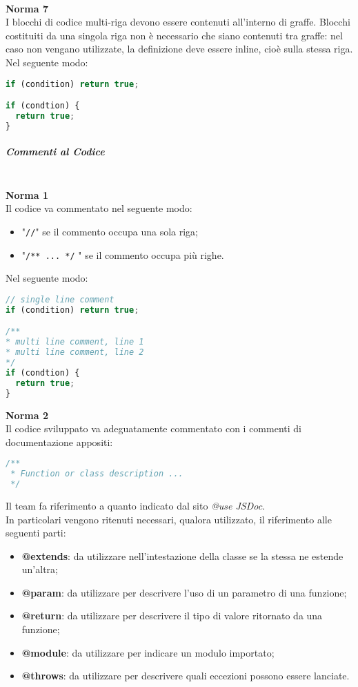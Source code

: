 \-\\
\textbf{Norma 7}\\
I blocchi di codice multi-riga devono essere contenuti all'interno di graffe. Blocchi costituiti da una singola riga non è necessario che siano contenuti tra graffe: nel caso non vengano utilizzate, la definizione deve essere inline, cioè sulla stessa riga.\\
Nel seguente modo:
\begin{lstlisting}[language=JavaScript]
if (condition) return true;

if (condtion) {
  return true;
}
\end{lstlisting}

\subparagraph{Commenti al Codice}\-\\
\textbf{Norma 1}\\
Il codice va commentato nel seguente modo:
\begin{itemize}
	\item "\texttt{//}" se il commento occupa una sola riga;
	\item "\texttt{/** ... */} " se il commento occupa più righe.
\end{itemize}
Nel seguente modo:
\begin{lstlisting}[language=JavaScript]
// single line comment
if (condition) return true;

/**
* multi line comment, line 1
* multi line comment, line 2
*/
if (condtion) {
  return true;
}
\end{lstlisting}
\textbf{Norma 2}\label{Docs_Codice}\\
Il codice sviluppato va adeguatamente commentato con i commenti di documentazione appositi:
\begin{lstlisting}[language=JavaScript]
/**
 * Function or class description ...
 */
\end{lstlisting}
Il team fa riferimento a quanto indicato dal sito \textit{@use JSDoc}.\\
In particolari vengono ritenuti necessari, qualora utilizzato, il riferimento alle seguenti parti:
\begin{itemize}
	\item \textbf{@extends}: da utilizzare nell'intestazione della classe se la stessa ne estende un'altra;
	\item \textbf{@param}: da utilizzare per descrivere l'uso di un parametro di una funzione;
	\item \textbf{@return}: da utilizzare per descrivere il tipo di valore ritornato da una funzione; 
	\item \textbf{@module}: da utilizzare per indicare un modulo importato;
	\item \textbf{@throws}: da utilizzare per descrivere quali eccezioni possono essere lanciate.
\end{itemize}
